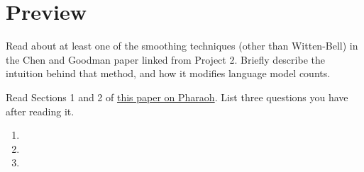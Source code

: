 \documentclass[11pt,letterpaper,boxed]{hmcpset}
\begin{document}
\pagebreak

\section*{Preview} 


\begin{problem}
Read about at least one of the smoothing techniques (other than
Witten-Bell) in the Chen and Goodman paper linked from Project
2. Briefly describe the intuition behind that method, and how it
modifies language model counts. 
\end{problem}

\begin{solution}
\vspace{10cm}
\end{solution}

\begin{problem}
Read Sections 1 and 2 of
\href{http://homepages.inf.ed.ac.uk/pkoehn/publications/pharaoh-amta2004.pdf}{this
  paper on Pharaoh}. List three questions you have after reading it.
\end{problem}
\begin{solution}
\begin{enumerate}
\item \vspace{2cm}
\item \vspace{2 cm}
\item \vspace{2 cm}
\end{enumerate}
\end{solution}
\end{document}
